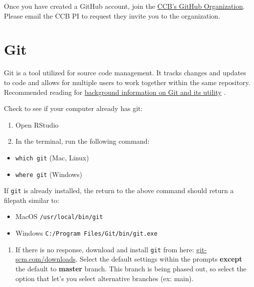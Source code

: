 \documentclass[
]{book}
\providecommand{\tightlist}{%
  \setlength{\itemsep}{0pt}\setlength{\parskip}{0pt}}
\begin{document}
Once you have created a GitHub account, join the \href{https://github.com/ccbucr}{CCB's GitHub Organization}. Please email the CCB PI to request they invite you to the organization.

\hypertarget{git-1}{%
\section{Git}\label{git-1}}

Git is a tool utilized for source code management. It tracks changes and updates to code and allows for multiple users to work together within the same repository. Recommended reading for \href{https://towardsdatascience.com/what-is-git-and-why-is-it-so-important-dce559b27833}{background information on Git and its utility} \citep{Yıldırım_2020}.

Check to see if your computer already has git:

\begin{enumerate}
\def\labelenumi{\arabic{enumi}.}
\tightlist
\item
  Open RStudio
\item
  In the terminal, run the following command:
\end{enumerate}

\begin{itemize}
\tightlist
\item
  \texttt{which\ git} (Mac, Linux)
\item
  \texttt{where\ git} (Windows)
\end{itemize}

If \texttt{git} is already installed, the return to the above command should return a filepath similar to:

\begin{itemize}
\tightlist
\item
  MacOS \texttt{/usr/local/bin/git}
\item
  Windows \texttt{C:/Program\ Files/Git/bin/git.exe}
\end{itemize}

\begin{enumerate}
\def\labelenumi{\arabic{enumi}.}
\setcounter{enumi}{2}
\tightlist
\item
  If there is no response, download and install \texttt{git} from here: \href{https://git-scm.com/downloads}{git-scm.com/downloads}. Select the default settings within the prompts \textbf{except} the default to \textbf{master} branch. This branch is being phased out, so select the option that let's you select alternative branches (ex: main).
\end{enumerate}
\end{document}
